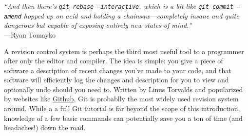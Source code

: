 \documentclass[openany,oneside]{report}
\renewenvironment{quote}{\list{}{\leftmargin=8\parindent}\item\relax}{\endlist}
\begin{document}
\begin{quote}
\emph{``And then there's \texttt{git rebase --interactive}, which is a bit like \texttt{git commit --amend} hopped up on acid and holding a chainsaw---completely insane and quite dangerous but capable of exposing entirely new states of mind."} \\ \hspace*{\fill}---Ryan Tomayko
\end{quote}

A revision control system is perhaps the third most useful tool to a programmer after only the editor and compiler.
The idea is simple: you give a piece of software a description of recent changes you've made to your code, and that software will efficiently log the changes and description for you to view and optionally undo should you need to.
Written by Linus Torvalds and popularized by websites like \href{https://Github.com/}{Github}, Git is probablly the most widely used revision system around. 
While a a full Git tutorial is far beyond the scope of this introduction, knowledge of a few basic commands can potentially save you a ton of time (and headaches!) down the road.
\end{document}
